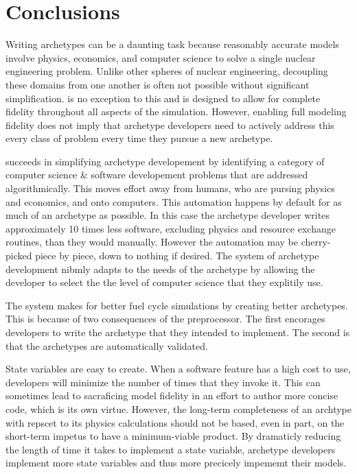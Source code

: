 \section{Conclusions}
\label{sec-conc}

Writing archetypes can be a daunting task because reasonably accurate models 
involve physics, economics, and computer science to solve a single nuclear engineering 
problem.  Unlike other spheres of nuclear engineering, decoupling these domains from
one another is often not possible without significant simplification. \cyclus is 
no exception to this and is designed to allow for complete fidelity throughout 
all aspects of the simulation. However, enabling full modeling fidelity does
not imply that archetype developers need to actively address this every class of 
problem every time they pursue a new archetype.

\Cyclus succeeds in simplifying archetype developement by identifying a category 
of computer science \& software developement problems that are addressed 
algorithmically. This moves effort away from humans, who are pursing physics and
economics, and onto computers. This automation happens by default for as much of
an archetype as possible. In this case the archetype developer writes approximately
10 times less software, excluding physics and resource exchange routines, than
they would manually. However the automation may be cherry-picked piece by piece,
down to nothing if desired. The \cyclus system of archetype development nibmly 
adapts to the needs of the archetype by allowing the developer to select the 
the level of computer science that they explitily use.  

The \cyclus system makes for better fuel cycle simulations by creating better 
archetypes.  This is because of two consequences of the preprocessor. The first 
\cyclus encorages developers to write the archetype
that they intended to implement. The second is that the archetypes are automatically
validated.

State variables are easy to create. When a software feature has a high cost to use,
developers will minimize the number of times that they invoke it. This can 
sometimes lead to sacraficing model fidelity in an effort to author more concise
code, which is its own virtue. However, the long-term completeness of an archtype
with repscet to its physics calculations should not be based, even in part, on the
short-term impetus to have a minimum-viable product. By dramaticly reducing the 
length of time it takes to implement a state variable, archetype developers implement
more state variables and thus more precicely impememt their models.

